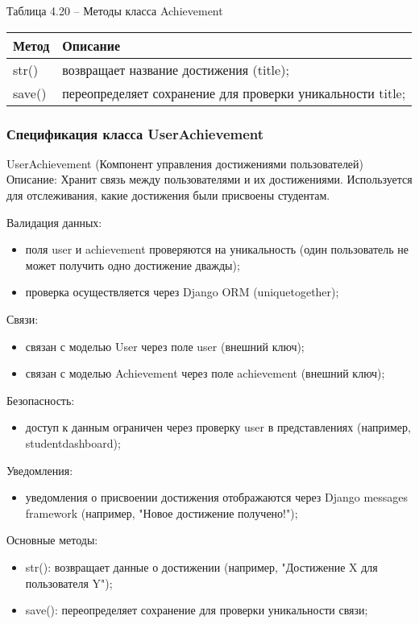 Таблица 4.20 – Методы класса Achievement \\
\begin{tabular}{|p{4cm}|p{8cm}|}
	\hline
	Метод & Описание \\
	\hline
	str() & возвращает название достижения (title); \\
	save() & переопределяет сохранение для проверки уникальности title; \\
	\hline
\end{tabular}

\subsubsection{Спецификация класса UserAchievement}
UserAchievement (Компонент управления достижениями пользователей) \\
Описание: Хранит связь между пользователями и их достижениями. Используется для отслеживания, какие достижения были присвоены студентам.

Валидация данных: 
\begin{itemize}
	\item поля user и achievement проверяются на уникальность (один пользователь не может получить одно достижение дважды); 
	\item проверка осуществляется через Django ORM (uniquetogether); 
\end{itemize}

Связи: 
\begin{itemize}
	\item связан с моделью User через поле user (внешний ключ); 
	\item связан с моделью Achievement через поле achievement (внешний ключ); 
\end{itemize}

Безопасность: 
\begin{itemize}
	\item доступ к данным ограничен через проверку user в представлениях (например, studentdashboard); 
\end{itemize}

Уведомления: 
\begin{itemize}
	\item уведомления о присвоении достижения отображаются через Django messages framework (например, "Новое достижение получено!"); 
\end{itemize}

Основные методы: 
\begin{itemize}
	\item str(): возвращает данные о достижении (например, "Достижение X для пользователя Y"); 
	\item save(): переопределяет сохранение для проверки уникальности связи; 
\end{itemize}

